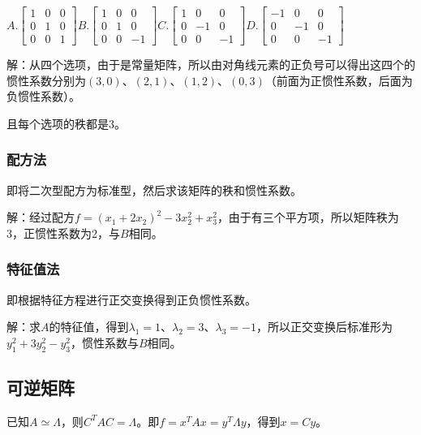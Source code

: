 \documentclass[UTF8, 12pt]{ctexart}
\begin{document}
$A.\left[\begin{array}{ccc}
    1 & 0 & 0 \\
    0 & 1 & 0 \\
    0 & 0 & 1
\end{array}\right]$\;$B.\left[\begin{array}{ccc}
    1 & 0 & 0 \\
    0 & 1 & 0 \\
    0 & 0 & -1
\end{array}\right]$\;$C.\left[\begin{array}{ccc}
    1 & 0 & 0 \\
    0 & -1 & 0 \\
    0 & 0 & -1
\end{array}\right]$\;$D.\left[\begin{array}{ccc}
    -1 & 0 & 0 \\
    0 & -1 & 0 \\
    0 & 0 & -1
\end{array}\right]$ \medskip

解：从四个选项，由于是常量矩阵，所以由对角线元素的正负号可以得出这四个的惯性系数分别为$(3,0)$、$(2,1)$、$(1,2)$、$(0,3)$（前面为正惯性系数，后面为负惯性系数）。

且每个选项的秩都是3。

\subsubsection{配方法}

即将二次型配方为标准型，然后求该矩阵的秩和惯性系数。

解：经过配方$f=(x_1+2x_2)^2-3x_2^2+x_3^2$，由于有三个平方项，所以矩阵秩为3，正惯性系数为2，与$B$相同。

\subsubsection{特征值法}

即根据特征方程进行正交变换得到正负惯性系数。

解：求$A$的特征值，得到$\lambda_1=1$、$\lambda_2=3$、$\lambda_3=-1$，所以正交变换后标准形为$y_1^2+3y_2^2-y_3^2$，惯性系数与$B$相同。

\subsection{可逆矩阵}

已知$A\simeq\Lambda$，则$C^TAC=\Lambda$。即$f=x^TAx=y^T\Lambda y$，得到$x=Cy$。
\end{document}
